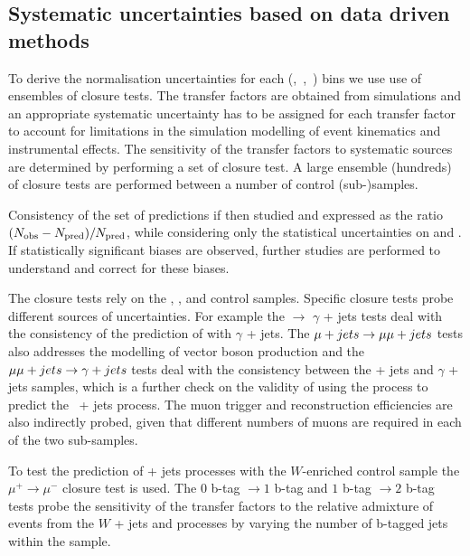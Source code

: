 \subsection{Systematic uncertainties based on data driven methods}
\label{sec:bkgdnorm-syst}

To derive the normalisation uncertainties for each (\njet,~\nb,~\scalht) bins we use use of ensembles of closure tests. The transfer factors are obtained from simulations and an appropriate systematic uncertainty has to be assigned for each transfer factor to account for limitations in the simulation modelling of event kinematics and instrumental effects. The sensitivity of the transfer factors to systematic sources are determined by performing a set of closure test.
 A large ensemble (\ie hundreds) of closure tests are performed between a number of control (sub-)samples.

Consistency of the set of predictions if then studied and expressed as the ratio $(N_{\textrm{obs}} - N_{\textrm{pred}})/N_{\textrm{pred}}$, while considering only
the statistical uncertainties on \npre and \nobs.  If statistically significant biases are observed, further studies are performed to understand and correct for these biases.

The closure tests rely on the \mj, \mmj, and \gj control samples. Specific closure tests probe different sources of uncertainties. 
For example the \mj $\rightarrow$ $\gamma$ + jets tests deal with the consistency
of the prediction of \wej with $\gamma$ + jets. The $\mu + jets \rightarrow \mu\mu + jets$ tests also addresses the modelling of
vector boson production and the $\mu\mu + jets \rightarrow \gamma + jets$ tests deal with the consistency between the \zee + jets and $\gamma$ + jets samples, which
is a further check on the validity of using the \gj process to predict the \znunu\, + jets process. The muon trigger and reconstruction
efficiencies are also indirectly probed, given that different numbers of muons are required in each of the two sub-samples.

To test the prediction of \znunu + jets processes with the $W$-enriched \mj control sample
the $\mu^{+}\rightarrow\mu^{-}$ closure test is used. The $0$ b-tag $\rightarrow1$ b-tag and $1$ b-tag $\rightarrow2$ b-tag
tests probe the sensitivity of the transfer factors to the relative admixture of events from the $W$ + jets and \ttbar processes by
varying the number of b-tagged jets within the \mj sample. 

